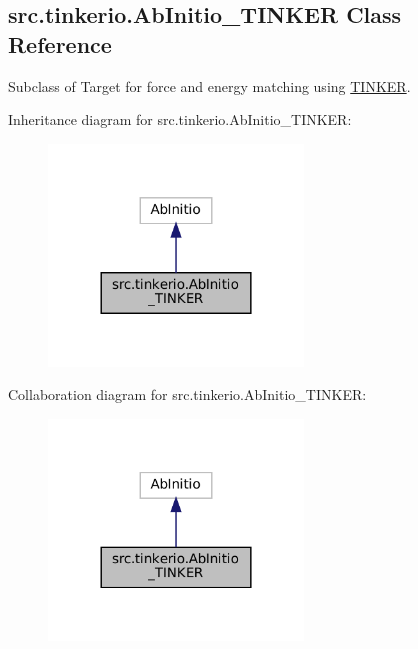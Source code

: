 \hypertarget{classsrc_1_1tinkerio_1_1AbInitio__TINKER}{}\subsection{src.\+tinkerio.\+Ab\+Initio\+\_\+\+T\+I\+N\+K\+ER Class Reference}
\label{classsrc_1_1tinkerio_1_1AbInitio__TINKER}


Subclass of Target for force and energy matching using \hyperlink{classsrc_1_1tinkerio_1_1TINKER}{T\+I\+N\+K\+ER}.  




Inheritance diagram for src.\+tinkerio.\+Ab\+Initio\+\_\+\+T\+I\+N\+K\+ER\+:
\nopagebreak
\begin{figure}[H]
\begin{center}
\leavevmode
\includegraphics[width=192pt]{classsrc_1_1tinkerio_1_1AbInitio__TINKER__inherit__graph}
\end{center}
\end{figure}


Collaboration diagram for src.\+tinkerio.\+Ab\+Initio\+\_\+\+T\+I\+N\+K\+ER\+:
\nopagebreak
\begin{figure}[H]
\begin{center}
\leavevmode
\includegraphics[width=192pt]{classsrc_1_1tinkerio_1_1AbInitio__TINKER__coll__graph}
\end{center}
\end{figure}
